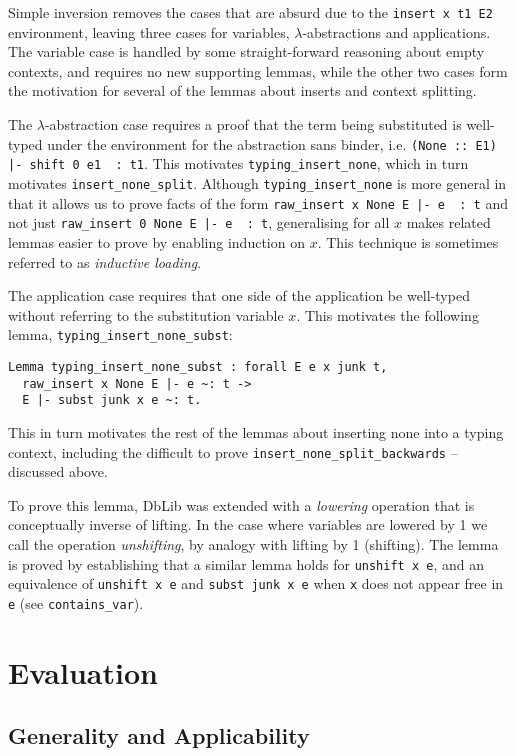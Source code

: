 \documentclass[]{unswthesis}
\let\c\texttt
\let\i\textit
\begin{document}
Simple inversion removes the cases that are absurd due to the \c{insert x t1 E2} environment, leaving three cases for variables, $\lambda$-abstractions and applications. The variable case is handled by some straight-forward reasoning about empty contexts, and requires no new supporting lemmas, while the other two cases form the motivation for several of the lemmas about inserts and context splitting.

The $\lambda$-abstraction case requires a proof that the term being substituted is well-typed under the environment for the abstraction sans binder, i.e. \c{(None :: E1) |- shift 0 e1 ~: t1}. This motivates \c{typing_insert_none}, which in turn motivates \c{insert_none_split}. Although \c{typing_insert_none} is more general in that it allows us to prove facts of the form \c{raw_insert x None E |- e ~: t} and not just \c{raw_insert 0 None E |- e ~: t}, generalising for all $x$ makes related lemmas easier to prove by enabling induction on $x$. This technique is sometimes referred to as \i{inductive loading}.

The application case requires that one side of the application be well-typed without referring to the substitution variable $x$. This motivates the following lemma, \c{typing_insert_none_subst}:

\begin{verbatim}
Lemma typing_insert_none_subst : forall E e x junk t,
  raw_insert x None E |- e ~: t ->
  E |- subst junk x e ~: t.
\end{verbatim}

This in turn motivates the rest of the lemmas about inserting none into a typing context, including the difficult to prove \c{insert_none_split_backwards} -- discussed above.

To prove this lemma, DbLib was extended with a \i{lowering} operation that is conceptually inverse of lifting. In the case where variables are lowered by 1 we call the operation \i{unshifting}, by analogy with lifting by 1 (shifting). The lemma is proved by establishing that a similar lemma holds for \c{unshift x e}, and an equivalence of \c{unshift x e} and \c{subst junk x e} when \c{x} does not appear free in \c{e} (see \c{contains_var}).

\chapter{Evaluation}

\section{Generality and Applicability}
\end{document}
